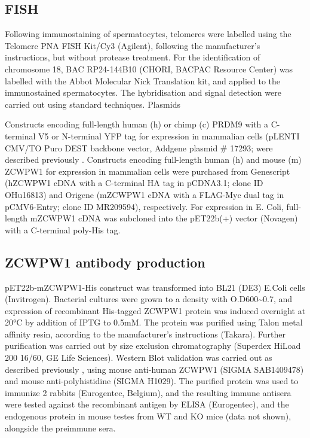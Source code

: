 \subsection{FISH}
\label{sec:fish}
Following immunostaining of spermatocytes, telomeres were labelled using the Telomere PNA FISH Kit/Cy3 (Agilent), following the manufacturer’s instructions, but without protease treatment. For the identification of chromosome 18, BAC RP24-144B10 (CHORI, BACPAC Resource Center) was labelled with the Abbot Molecular Nick Translation kit, and applied to the immunostained spermatocytes. The hybridisation and signal detection were carried out using standard techniques.
Plasmids

Constructs encoding full-length human (h) or chimp (c) PRDM9 with a C-terminal V5 or N-terminal YFP tag for expression in mammalian cells (pLENTI CMV/TO Puro DEST backbone vector, Addgene plasmid \# 17293; \cite{Campeau2009Versatile} were described previously \parencite{Altemose2017map}. Constructs encoding full-length human (h) and mouse (m) ZCWPW1 for expression in mammalian cells were purchased from Genescript (hZCWPW1 cDNA with a C-terminal HA tag in pCDNA3.1; clone ID OHu16813) and Origene (mZCWPW1 cDNA with a FLAG-Myc dual tag in pCMV6-Entry; clone ID MR209594), respectively. For expression in E. Coli, full-length mZCWPW1 cDNA was subcloned into the pET22b(+) vector (Novagen) with a C-terminal poly-His tag. 

\subsection{ZCWPW1 antibody production}
\label{sec:zcwAb}
pET22b-mZCWPW1-His construct was transformed into BL21 (DE3) E.Coli cells (Invitrogen). Bacterial cultures were grown to a density with O.D600\textasciitilde0.7, and expression of recombinant His-tagged ZCWPW1 protein was induced overnight at 20°C by addition of IPTG to 0.5mM. The protein was purified using Talon metal affinity resin, according to the manufacturer’s instructions (Takara). Further purification was carried out by size exclusion chromatography (Superdex HiLoad 200 16/60, GE Life Sciences). Western Blot validation was carried out as described previously \parencite{Altemose2017map}, using mouse anti-human ZCWPW1 (SIGMA SAB1409478) and mouse anti-polyhistidine (SIGMA H1029). The purified protein was used to immunize 2 rabbits (Eurogentec, Belgium), and the resulting immune antisera were tested against the recombinant antigen by ELISA (Eurogentec), and the endogenous protein in mouse testes from WT and KO mice (data not shown), alongside the preimmune sera. 

